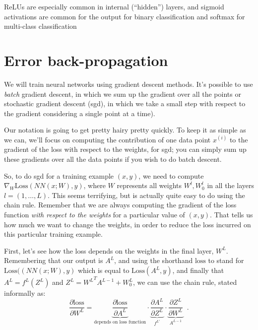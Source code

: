 \documentclass[11pt]{article}
\newcommand{\ex}[2]{#1^{(#2)}}
\newcommand\ex[2]{#1^{(#2)}}
\newcommand{\qn}[1]{\textcolor{orange}{Quynh: #1}}
\begin{document}
ReLUs are especially common in internal (``hidden'') layers, and
sigmoid activations are common for the output for binary
classification and softmax for multi-class classification




\section{Error back-propagation}
We will train neural networks using gradient descent methods.  It's
possible to use {\em batch} gradient descent, in which we sum up the
gradient over all the points or
stochastic gradient descent ({\sc sgd}), in which we take a small step with
respect to the gradient considering a single point at a time).

Our notation is going to get pretty hairy pretty quickly.  To keep it
as simple as we can, we'll focus on computing the contribution of one
data point $\ex{x}{i}$ to the gradient of the loss with respect to the
weights, for {\sc sgd}; you can simply sum up these gradients over all
the data points if you wish to do batch descent.

So, to do {\sc sgd} for a training example $(x, y)$, we need to
compute $\nabla_W \text{Loss}(NN(x;W),y)$, 
where $W$ represents all weights $W^l, W_0^l$ in all the layers $l =
(1, \ldots, L)$. This seems terrifying,
but is actually quite easy to do using the chain rule. 
Remember that we are always computing the gradient of the loss
function {\em with respect to the weights} for a particular value of
$(x,  y)$.  That tells us how much we want to change the weights, in
order to reduce the loss incurred on this particular training example.

First, let's see how the loss depends on the weights in the final
layer, $W^L$.  Remembering that our output is $A^L$, and using the
shorthand $\text{loss}$ to stand for $\text{Loss}((NN(x;W),y)$ which
is equal to $\text{Loss}(A^L, y)$, and finally that $A^L = f^L(Z^L)$ and
$Z^L = {W^L}^T A^{L-1} +W_0^L$, we can use the chain rule, stated informally as:
\[
  \frac{\partial \text{loss}}{\partial W^L} = \underbrace{
  \frac{\partial \text{loss}}{\partial A^L}}_{\text{depends on loss
  function}} \cdot
  \underbrace{\frac{\partial A^L}{\partial Z^L}}_{f^{L'}} \cdot
  \underbrace{\frac{\partial Z^L}{\partial W^L}}_{\text{$A^{L-1}$}}
\;\;.\]
  
\end{document}
